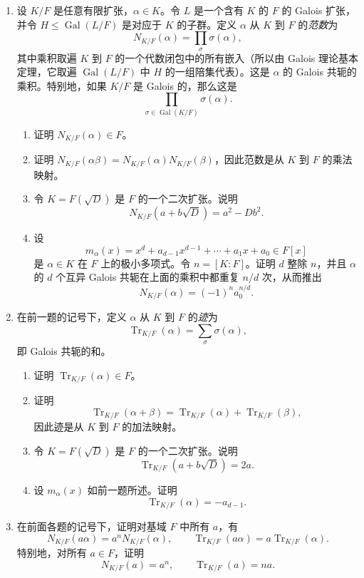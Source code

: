 \begin{enumerate}[label=\arabic*.]
\item 设 $K/F$ 是任意有限扩张，$\alpha\in K$。令 $L$ 是一个含有 $K$ 的 $F$ 的 Galois 扩张，并令 $H\leq\operatorname{Gal}(L/F)$ 是对应于 $K$ 的子群。定义 $\alpha$ 从 $K$ 到 $F$ 的\emph{范数}为
\[
N_{K/F}(\alpha)=\prod_\sigma \sigma(\alpha),
\]
其中乘积取遍 $K$ 到 $F$ 的一个代数闭包中的所有嵌入（所以由 Galois 理论基本定理，它取遍 $\operatorname{Gal}(L/F)$ 中 $H$ 的一组陪集代表）。这是 $\alpha$ 的 Galois 共轭的乘积。特别地，如果 $K/F$ 是 Galois 的，那么这是
\[
\prod_{\sigma\in\operatorname{Gal}(K/F)}\sigma(\alpha).
\]
\begin{enumerate}[label=(\alph*)]
\item 证明 $N_{K/F}(\alpha)\in F$。
\item 证明 $N_{K/F}(\alpha\beta)=N_{K/F}(\alpha)N_{K/F}(\beta)$，因此范数是从 $K$ 到 $F$ 的乘法映射。
\item 令 $K=F(\sqrt D)$ 是 $F$ 的一个二次扩张。说明
\[
N_{K/F}(a+b\sqrt D)=a^2-Db^2.
\]
\item 设
\[
m_\alpha(x)=x^d+a_{d-1}x^{d-1}+\cdots+a_1x+a_0\in F[x]
\]
是 $\alpha\in K$ 在 $F$ 上的极小多项式。令 $n=[K:F]$。证明 $d$ 整除 $n$，并且 $\alpha$ 的 $d$ 个互异 Galois 共轭在上面的乘积中都重复 $n/d$ 次，从而推出
\[
N_{K/F}(\alpha)=(-1)^n a_0^{n/d}.
\]
\end{enumerate}

\item 在前一题的记号下，定义 $\alpha$ 从 $K$ 到 $F$ 的\emph{迹}为
\[
\operatorname{Tr}_{K/F}(\alpha)=\sum_\sigma \sigma(\alpha),
\]
即 Galois 共轭的和。
\begin{enumerate}[label=(\alph*)]
\item 证明 $\operatorname{Tr}_{K/F}(\alpha)\in F$。
\item 证明
\[
\operatorname{Tr}_{K/F}(\alpha+\beta)=\operatorname{Tr}_{K/F}(\alpha)+\operatorname{Tr}_{K/F}(\beta),
\]
因此迹是从 $K$ 到 $F$ 的加法映射。
\item 令 $K=F(\sqrt D)$ 是 $F$ 的一个二次扩张。说明
\[
\operatorname{Tr}_{K/F}(a+b\sqrt D)=2a.
\]
\item 设 $m_\alpha(x)$ 如前一题所述。证明
\[
\operatorname{Tr}_{K/F}(\alpha)=-a_{d-1}.
\]
\end{enumerate}

\item 在前面各题的记号下，证明对基域 $F$ 中所有 $a$，有
\[
N_{K/F}(a\alpha)=a^nN_{K/F}(\alpha),
\qquad
\operatorname{Tr}_{K/F}(a\alpha)=a\operatorname{Tr}_{K/F}(\alpha).
\]
特别地，对所有 $a\in F$，证明
\[
N_{K/F}(a)=a^n,
\qquad
\operatorname{Tr}_{K/F}(a)=na.
\]


\end{enumerate}
